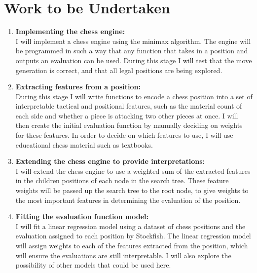 \documentclass[12pt,a4paper]{article}
\begin{document}
\section*{Work to be Undertaken}
\begin{enumerate}
    \item \textbf{Implementing the chess engine:}
    \\I will implement a chess engine using the minimax algorithm. The engine will be programmed in such a way that any function that takes in a position and outputs an evaluation can be used. During this stage I will test that the move generation is correct, and that all legal positions are being explored.

    \item \textbf{Extracting features from a position:}
    \\During this stage I will write functions to encode a chess position into a set of interpretable tactical and positional features, such as the material count of each side and whether a piece is attacking two other pieces at once. I will then create the initial evaluation function by manually deciding on weights for these features. In order to decide on which features to use, I will use educational chess material such as textbooks.

    \item \textbf{Extending the chess engine to provide interpretations:}
    \\I will extend the chess engine to use a weighted sum of the extracted features in the children positions of each node in the search tree. These feature weights will be passed up the search tree to the root node, to give weights to the most important features in determining the evaluation of the position.

    \item \textbf{Fitting the evaluation function model:}
    \\I will fit a linear regression model using a dataset of chess positions and the evaluation assigned to each position by Stockfish. The linear regression model will assign weights to each of the features extracted from the position, which will ensure the evaluations are still interpretable. I will also explore the possibility of other models that could be used here.


\end{enumerate}
\end{document}
